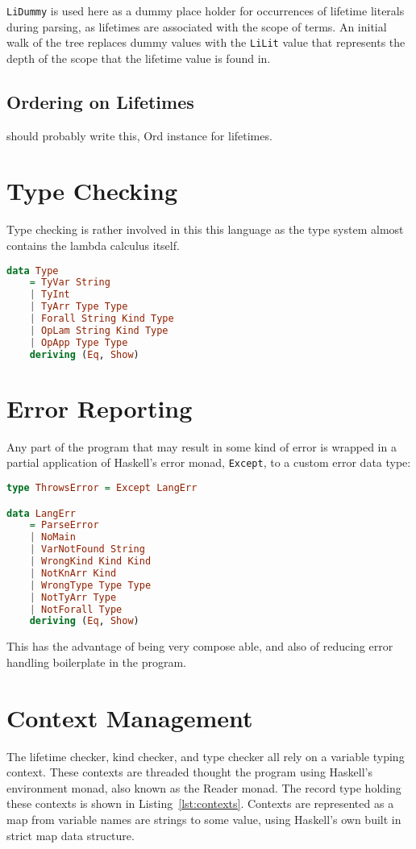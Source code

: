 \lstinline{LiDummy} is used here as a dummy place holder for occurrences of
lifetime literals during parsing, as lifetimes are associated with the scope of
terms. An initial walk of the tree replaces dummy values with the
\lstinline{LiLit} value that represents the depth of the scope that the
lifetime value is found in.

\subsection{Ordering on Lifetimes}
should probably write this, Ord instance for lifetimes.

\section{Type Checking}
Type checking is rather involved in this this language as the type system
almost contains the lambda calculus itself.

\begin{lstlisting}[caption=Haskell representation of Types., language=Haskell, label={lst:types}]
data Type
    = TyVar String
    | TyInt
    | TyArr Type Type
    | Forall String Kind Type
    | OpLam String Kind Type
    | OpApp Type Type
    deriving (Eq, Show)
\end{lstlisting}

\section{Error Reporting}
Any part of the program that may result in some kind of error is wrapped in a
partial application of Haskell's error monad, \lstinline{Except}, to a custom
error data type:

\begin{lstlisting}[caption=Partially applied error monad and langauge errors., language=Haskell, label={lst:types}]
type ThrowsError = Except LangErr

data LangErr
    = ParseError
    | NoMain
    | VarNotFound String
    | WrongKind Kind Kind
    | NotKnArr Kind
    | WrongType Type Type
    | NotTyArr Type
    | NotForall Type
    deriving (Eq, Show)
\end{lstlisting}

This has the advantage of being very compose able, and also of reducing error
handling boilerplate in the program.

\section{Context Management}
The lifetime checker, kind checker, and type checker all rely on a variable
typing context. These contexts are threaded thought the program using Haskell's
environment monad, also known as the Reader monad. The record type holding
these contexts is shown in Listing~\ref{lst:contexts}. Contexts are represented
as a map from variable names are strings to some value, using Haskell's own
built in strict map data structure.

